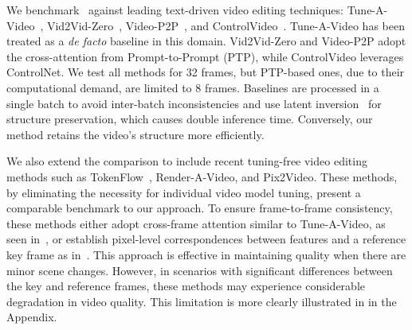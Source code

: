 We benchmark \ours\ against leading text-driven video editing techniques: Tune-A-Video~\cite{tuneavideo}, Vid2Vid-Zero~\cite{vid2vid}, Video-P2P~\cite{liu2023video}, and ControlVideo~\cite{zhao2023controlvideo}. Tune-A-Video has been treated as a \textit{de facto} baseline in this domain. Vid2Vid-Zero and Video-P2P adopt the cross-attention from Prompt-to-Prompt (PTP)\cite{prompt2prompt}, while ControlVideo leverages ControlNet\cite{controlnet}. We test all methods for 32 frames, but PTP-based ones, due to their computational demand, are limited to 8 frames. Baselines are processed in a single batch to avoid inter-batch inconsistencies and use latent inversion~\cite{mokady2023null} for structure preservation, which causes double inference time. Conversely, our method retains the video's structure more efficiently. 

We also extend the comparison to include recent tuning-free video editing methods such as TokenFlow~\cite{geyer2023tokenflow}, Render-A-Video\cite{yang2023rerender}, and Pix2Video\cite{ceylan2023pix2video}. These methods, by eliminating the necessity for individual video model tuning, present a comparable benchmark to our approach. To ensure frame-to-frame consistency, these methods either adopt cross-frame attention similar to Tune-A-Video\cite{tuneavideo}, as seen in~\cite{ceylan2023pix2video, yang2023rerender}, or establish pixel-level correspondences between features and a reference key frame as in~\cite{geyer2023tokenflow}. This approach is effective in maintaining quality when there are minor scene changes. However, in scenarios with significant differences between the key and reference frames, these methods may experience considerable degradation in video quality. This limitation is more clearly illustrated in  in the Appendix.


